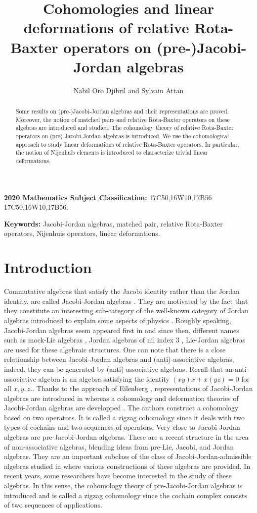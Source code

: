 \documentclass[12pt]{amsart}
\title[Cohomologies and linear deformations of relative Rota-Baxter operators+]{Cohomologies and linear deformations of relative Rota-Baxter operators on (pre-)Jacobi-Jordan algebras}
\author[N. Oro Djibril and S. Attan ]
{Nabil Oro Djibril and Sylvain Attan }
\begin{document}
	\maketitle
	\begin{abstract}
		Some results on (pre-)Jacobi-Jordan algebras and their representations are proved. Moreover, the notion of matched pairs and relative Rota-Baxter operators on these algebras are introduced  and studied. The cohomology theory of relative Rota-Baxter operators on (pre)-Jacobi-Jordan algebras is introduced. We use the cohomological approach to study linear  deformations of relative Rota-Baxter operators. In particular, the notion of Nijenhuis elements is introduced
		to characterize trivial linear deformations. 
	\end{abstract}
	{\bf 2020 Mathematics Subject Classification:} 17C50,16W10,17B56 
	17C50,16W10,17B56.
	
	{\bf Keywords:} Jacobi-Jordan algebras, matched pair, relative Rota-Baxter operators, Nijenhuis operators, linear deformations.
	\section{Introduction}
	Commutative algebras that satisfy the Jacobi identity rather than the Jordan identity, are called Jacobi-Jordan algebras \cite{dbaf}. They are motivated by the fact that they constitute an interesting sub-category  of the well-known category of Jordan algebras introduced to explain some aspects of physics \cite{pjjvn}. Roughly speaking, Jacobi-Jordan algebras seem appeared first in \cite{kaz} and since then, different names such as mock-Lie algebras \cite{egmk}, Jordan algebras of nil index 3 \cite{sw}, Lie-Jordan algebras \cite{sonk} are  used for these algebraic structures. One can note that
	there is a close relationship between Jacobi-Jordan algebras and (anti)-associative algebras, indeed, they can be generated by 
	(anti)-associative algebras. Recall that an anti-associative algebra is an
	algebra satisfying the identity $(xy)x+ x(yz)=0$ for all $x,y,z.$.  Thanks to the approach of Eilenberg \cite{nj},  representations of Jacobi-Jordan algebras are introduced in \cite{pzu} whereas  a cohomology and deformation theories of Jacobi-Jordan algebras are developped \cite{aBsBaMsM}. The authors construct a cohomology based on two operators. It is called a zigzag cohomology since it deals with two types of cochains and two sequences of operators. Very close to Jacobi-Jordan algebras are pre-Jacobi-Jordan algebras. These are a  recent structure in the area of non-associative algebras, blending ideas from pre-Lie, Jacobi, and Jordan algebras. They are an important subclass of the class of Jacobi-Jordan-admissible algebras studied in \cite{bbmm} where various constructions of these algebras are provided. In recent years, some researchers have become interested in the study of these algebras. In this sense, the cohomology theory of pre-Jacobi-Jordan algebras is introduced \cite{aod} and is called a zigzag cohomology since the cochain complex consists of two sequences of applications. 
	
\end{document}
